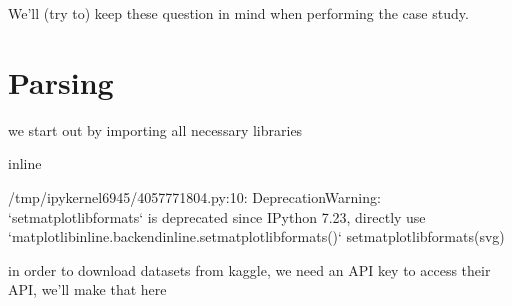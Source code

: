 \documentclass[letterpaper,10pt,english]{jupyterBook}
\begin{document}
\sphinxAtStartPar
We’ll (try to) keep these question in mind when performing the case study.


\section{Parsing}
\label{\detokenize{c7_case_studies/Olist:parsing}}
\sphinxAtStartPar
we start out by importing all necessary libraries

\begin{sphinxVerbatim}[commandchars=\\\{\}]
 
 
   
   
   
 
   
   
 inline
\end{sphinxVerbatim}

\begin{sphinxVerbatim}[commandchars=\\\{\}]
/tmp/ipykernel\PYGZus{}6945/4057771804.py:10: DeprecationWarning: `set\PYGZus{}matplotlib\PYGZus{}formats` is deprecated since IPython 7.23, directly use `matplotlib\PYGZus{}inline.backend\PYGZus{}inline.set\PYGZus{}matplotlib\PYGZus{}formats()`
  set\PYGZus{}matplotlib\PYGZus{}formats(\PYGZsq{}svg\PYGZsq{})
\end{sphinxVerbatim}

\sphinxAtStartPar
in order to download datasets from kaggle, we need an API key to access their API, we’ll make that here
\end{document}
